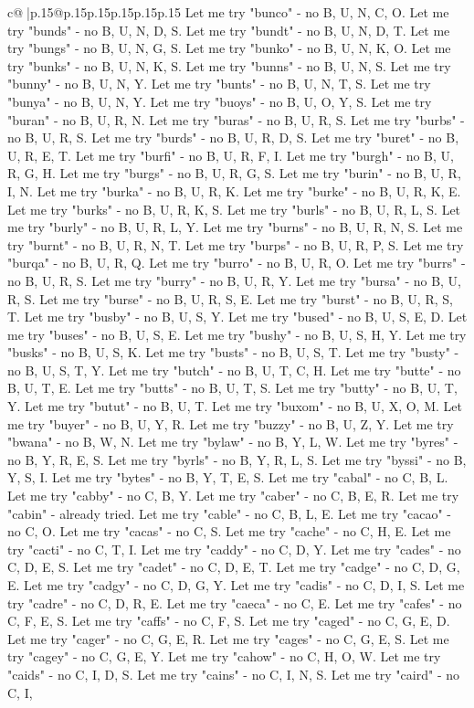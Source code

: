 \documentclass{article}
\begin{document}
{\begin{supertabular}{c@{$\;$}|p{.15\linewidth}@{}p{.15\linewidth}p{.15\linewidth}p{.15\linewidth}p{.15\linewidth}p{.15\linewidth}}
{{{Let me try "bunco" {-} no B, U, N, C, O. Let me try "bunds" {-} no B, U, N, D, S. Let me try "bundt" {-} no B, U, N, D, T. Let me try "bungs" {-} no B, U, N, G, S. Let me try "bunko" {-} no B, U, N, K, O. Let me try "bunks" {-} no B, U, N, K, S. Let me try "bunns" {-} no B, U, N, S. Let me try "bunny" {-} no B, U, N, Y. Let me try "bunts" {-} no B, U, N, T, S. Let me try "bunya" {-} no B, U, N, Y. Let me try "buoys" {-} no B, U, O, Y, S. Let me try "buran" {-} no B, U, R, N. Let me try "buras" {-} no B, U, R, S. Let me try "burbs" {-} no B, U, R, S. Let me try "burds" {-} no B, U, R, D, S. Let me try "buret" {-} no B, U, R, E, T. Let me try "burfi" {-} no B, U, R, F, I. Let me try "burgh" {-} no B, U, R, G, H. Let me try "burgs" {-} no B, U, R, G, S. Let me try "burin" {-} no B, U, R, I, N. Let me try "burka" {-} no B, U, R, K. Let me try "burke" {-} no B, U, R, K, E. Let me try "burks" {-} no B, U, R, K, S. Let me try "burls" {-} no B, U, R, L, S. Let me try "burly" {-} no B, U, R, L, Y. Let me try "burns" {-} no B, U, R, N, S. Let me try "burnt" {-} no B, U, R, N, T. Let me try "burps" {-} no B, U, R, P, S. Let me try "burqa" {-} no B, U, R, Q. Let me try "burro" {-} no B, U, R, O. Let me try "burrs" {-} no B, U, R, S. Let me try "burry" {-} no B, U, R, Y. Let me try "bursa" {-} no B, U, R, S. Let me try "burse" {-} no B, U, R, S, E. Let me try "burst" {-} no B, U, R, S, T. Let me try "busby" {-} no B, U, S, Y. Let me try "bused" {-} no B, U, S, E, D. Let me try "buses" {-} no B, U, S, E. Let me try "bushy" {-} no B, U, S, H, Y. Let me try "busks" {-} no B, U, S, K. Let me try "busts" {-} no B, U, S, T. Let me try "busty" {-} no B, U, S, T, Y. Let me try "butch" {-} no B, U, T, C, H. Let me try "butte" {-} no B, U, T, E. Let me try "butts" {-} no B, U, T, S. Let me try "butty" {-} no B, U, T, Y. Let me try "butut" {-} no B, U, T. Let me try "buxom" {-} no B, U, X, O, M. Let me try "buyer" {-} no B, U, Y, R. Let me try "buzzy" {-} no B, U, Z, Y. Let me try "bwana" {-} no B, W, N. Let me try "bylaw" {-} no B, Y, L, W. Let me try "byres" {-} no B, Y, R, E, S. Let me try "byrls" {-} no B, Y, R, L, S. Let me try "byssi" {-} no B, Y, S, I. Let me try "bytes" {-} no B, Y, T, E, S. Let me try "cabal" {-} no C, B, L. Let me try "cabby" {-} no C, B, Y. Let me try "caber" {-} no C, B, E, R. Let me try "cabin" {-} already tried. Let me try "cable" {-} no C, B, L, E. Let me try "cacao" {-} no C, O. Let me try "cacas" {-} no C, S. Let me try "cache" {-} no C, H, E. Let me try "cacti" {-} no C, T, I. Let me try "caddy" {-} no C, D, Y. Let me try "cades" {-} no C, D, E, S. Let me try "cadet" {-} no C, D, E, T. Let me try "cadge" {-} no C, D, G, E. Let me try "cadgy" {-} no C, D, G, Y. Let me try "cadis" {-} no C, D, I, S. Let me try "cadre" {-} no C, D, R, E. Let me try "caeca" {-} no C, E. Let me try "cafes" {-} no C, F, E, S. Let me try "caffs" {-} no C, F, S. Let me try "caged" {-} no C, G, E, D. Let me try "cager" {-} no C, G, E, R. Let me try "cages" {-} no C, G, E, S. Let me try "cagey" {-} no C, G, E, Y. Let me try "cahow" {-} no C, H, O, W. Let me try "caids" {-} no C, I, D, S. Let me try "cains" {-} no C, I, N, S. Let me try "caird" {-} no C, I, }}}
\end{supertabular}}
\end{document}

